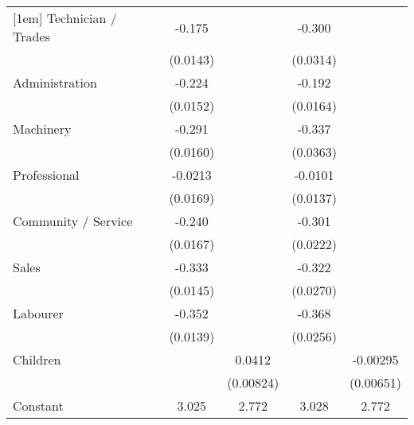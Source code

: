 {\begin{tabular}{l*{4}{c}}
[1em]
Technician / Trades &      -0.175\sym{***}&                     &      -0.300\sym{***}&                     \\
                    &    (0.0143)         &                     &    (0.0314)         &                     \\
[1em]
Administration      &      -0.224\sym{***}&                     &      -0.192\sym{***}&                     \\
                    &    (0.0152)         &                     &    (0.0164)         &                     \\
[1em]
Machinery           &      -0.291\sym{***}&                     &      -0.337\sym{***}&                     \\
                    &    (0.0160)         &                     &    (0.0363)         &                     \\
[1em]
Professional        &     -0.0213         &                     &     -0.0101         &                     \\
                    &    (0.0169)         &                     &    (0.0137)         &                     \\
[1em]
Community / Service &      -0.240\sym{***}&                     &      -0.301\sym{***}&                     \\
                    &    (0.0167)         &                     &    (0.0222)         &                     \\
[1em]
Sales               &      -0.333\sym{***}&                     &      -0.322\sym{***}&                     \\
                    &    (0.0145)         &                     &    (0.0270)         &                     \\
[1em]
Labourer            &      -0.352\sym{***}&                     &      -0.368\sym{***}&                     \\
                    &    (0.0139)         &                     &    (0.0256)         &                     \\
[1em]
Children            &                     &      0.0412\sym{***}&                     &    -0.00295         \\
                    &                     &   (0.00824)         &                     &   (0.00651)         \\
[1em]
Constant            &       3.025\sym{***}&       2.772\sym{***}&       3.028\sym{***}&       2.772\sym{***}\\

\end{tabular}}
